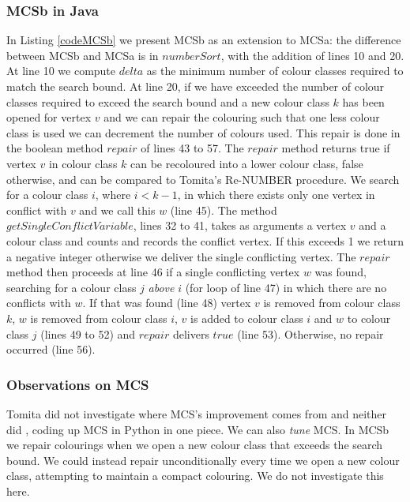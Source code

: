\documentclass{l4proj}
\begin{document}
\subsubsection{MCSb in Java}

\begin{figure}

\end{figure}

In Listing \ref{codeMCSb} we present MCSb as an extension to MCSa: the difference between MCSb and MCSa is in $numberSort$,
with the addition of lines 10 and  20. At line 10 we compute $delta$ as the minimum number of colour classes required to match 
the search bound. At line 20, if we have exceeded the number of colour classes required to exceed the search bound and
a new colour class $k$ has been opened for vertex $v$ and we can repair the colouring such that one less colour class is used
we can decrement the number of colours used. This repair is done in the boolean method $repair$ of lines 43 to 57.  The $repair$ method returns
true if vertex $v$ in colour class $k$ can be recoloured into a lower colour class, false otherwise, and can be compared to Tomita's Re-NUMBER
procedure. We search for a colour class $i$, where $i < k-1$, in which there exists only one vertex in conflict with $v$ and we call this
$w$ (line 45). The method $getSingleConflictVariable$, lines 32 to 41, takes as arguments a vertex $v$ and a colour class 
and counts and records the conflict vertex. If this exceeds 1 we return a negative integer otherwise we deliver the single 
conflicting vertex. The $repair$ method then proceeds at line 46 if a single conflicting vertex $w$ was found, searching
for a colour class $j$ \emph{above} $i$ (for loop of line 47) in which there are no conflicts with  $w$. If that was found (line 48)
vertex $v$ is removed from colour class $k$, $w$ is removed from colour class $i$, $v$ is added to colour class $i$ and $w$ to colour class $j$ 
(lines 49 to 52) and $repair$ delivers $true$ (line 53). Otherwise, no repair occurred (line 56).

\subsubsection{Observations on MCS}
Tomita did not investigate where MCS's improvement comes from and neither did \cite{carmoZuge},
coding up MCS in Python in one piece. We can also \emph{tune} MCS. In MCSb we repair colourings when we open a new colour class
that exceeds the search bound. We could instead repair unconditionally every time we open a new colour class, attempting to maintain a compact
colouring. We do not investigate this here.
\end{document}
